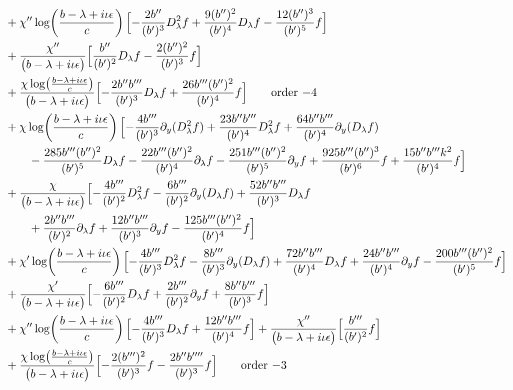 \documentclass[reqno,11pt]{amsart}
\numberwithin{equation}{section}
\newcommand{\p}{\partial}
\newcommand{\D}{D_\lambda}
\numberwithin{equation}{section} %
\begin{document}
\begin{enumerate}
\begin{align}
&+\chi''\log\!\left(\frac{b -\lambda+i\iota\epsilon}{c}\right)\Bigl[- \frac{2 b'' }{(b' )^{3}} \D^2 f+\frac{9 (b'' )^{2}}{(b' )^{4}} \D f- \frac{12 (b'' )^{3}}{(b' )^{5}} f\Bigr]\notag\\
&+\frac{\chi''}{\bigl(b -\lambda+i\iota\epsilon\bigr)}\Bigl[\frac{b'' }{(b' )^{2}} \D f- \frac{2 (b'' )^{2}}{(b' )^{3}} f\Bigr]\notag\\
&+\frac{\chi\log\!\left(\frac{b -\lambda+i\iota\epsilon}{c}\right)}{\bigl(b -\lambda+i\iota\epsilon\bigr)}\Bigl[- \frac{2 b''  b''' }{(b' )^{3}} \D f+\frac{26 b'''  (b'' )^{2}}{(b' )^{4}} f\Bigr]\tag*{\text{order $-4$}}\\
&+\chi\log\!\left(\frac{b -\lambda+i\iota\epsilon}{c}\right)\Bigl[- \frac{4 b''' }{(b' )^{3}} \p_y(\D^2 f)+\frac{23 b''  b''' }{(b' )^{4}} \D^2 f+\frac{64 b''  b''' }{(b' )^{4}} \p_y(\D f)\notag\\
&\qquad - \frac{285 b'''  (b'' )^{2}}{(b' )^{5}} \D f- \frac{22 b'''  (b'' )^{2}}{(b' )^{4}} \p_\lambda f- \frac{251 b'''  (b'' )^{2}}{(b' )^{5}} \p_y f+\frac{925 b'''  (b'' )^{3}}{(b' )^{6}} f+\frac{15 b''  b'''  k^2}{(b' )^{4}} f\Bigr]\notag\\
&+\frac{\chi}{\bigl(b -\lambda+i\iota\epsilon\bigr)}\Bigl[- \frac{4 b''' }{(b' )^{2}} \D^2 f- \frac{6 b''' }{(b' )^{2}} \p_y(\D f)+\frac{52 b''  b''' }{(b' )^{3}} \D f\notag\\
&\qquad +\frac{2 b''  b''' }{(b' )^{2}} \p_\lambda f+\frac{12 b''  b''' }{(b' )^{3}} \p_y f- \frac{125 b'''  (b'' )^{2}}{(b' )^{4}} f\Bigr]\notag\\
&+\chi'\log\!\left(\frac{b -\lambda+i\iota\epsilon}{c}\right)\Bigl[- \frac{4 b''' }{(b' )^{3}} \D^2 f- \frac{8 b''' }{(b' )^{3}} \p_y(\D f)+\frac{72 b''  b''' }{(b' )^{4}} \D f+\frac{24 b''  b''' }{(b' )^{4}} \p_y f - \frac{200 b'''  (b'' )^{2}}{(b' )^{5}} f\Bigr]\notag\\
&+\frac{\chi'}{\bigl(b -\lambda+i\iota\epsilon\bigr)}\Bigl[- \frac{6 b''' }{(b' )^{2}} \D f+\frac{2 b''' }{(b' )^{2}} \p_y f+\frac{8 b''  b''' }{(b' )^{3}} f\Bigr]\notag\\
&+\chi''\log\!\left(\frac{b -\lambda+i\iota\epsilon}{c}\right)\Bigl[- \frac{4 b''' }{(b' )^{3}} \D f+\frac{12 b''  b''' }{(b' )^{4}} f\Bigr]+\frac{\chi''}{\bigl(b -\lambda+i\iota\epsilon\bigr)}\Bigl[\frac{b''' }{(b' )^{2}} f\Bigr]\notag\\
&+\frac{\chi\log\!\left(\frac{b -\lambda+i\iota\epsilon}{c}\right)}{\bigl(b -\lambda+i\iota\epsilon\bigr)}\Bigl[- \frac{2 (b''' )^{2}}{(b' )^{3}} f- \frac{2 b''  b'''' }{(b' )^{3}} f\Bigr]\tag*{\text{order $-3$}}\\

\end{align}
\end{enumerate}
\end{document}
